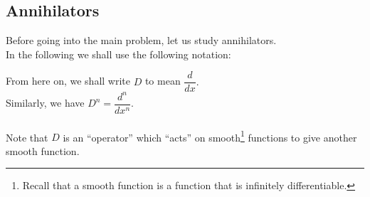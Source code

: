 \subsection{Annihilators}
Before going into the main problem, let us study annihilators. \\
In the following we shall use the following notation:
\begin{mdframed}[style=boxstyle, frametitle={Notation}]
	From here on, we shall write $D$ to mean $\dfrac{d}{dx}.$\\
	Similarly, we have $D^n = \dfrac{d^n}{dx^n}.$ \\~\\
	Note that $D$ is an ``operator'' which ``acts'' on smooth\footnote{Recall that a smooth function is a function that is infinitely differentiable.} functions to give another smooth function.
\end{mdframed}
	
